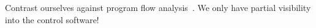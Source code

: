 Contrast ourselves against program flow
analysis~\cite{zhang2006dynamic,tallam2007enabling,Lee:2011:TGR:1993498.1993528,huang2012lean}.
We only have partial visibility into the control software!
